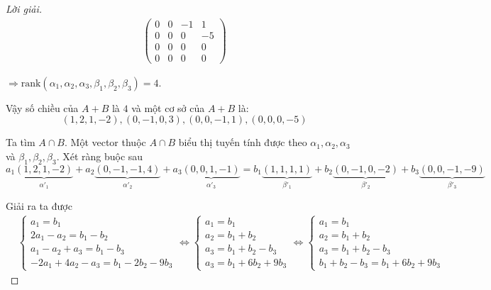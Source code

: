 \documentclass[class=linearalgebra,crop=false]{standalone}
\begin{document}
\begin{proof}[Lời giải]
\begin{align*}
\begin{pmatrix}
            0 & 0  & -1 & 1  \\
            0 & 0  & 0  & -5 \\
            0 & 0  & 0  & 0  \\
            0 & 0  & 0  & 0
        \end{pmatrix}
    \end{align*}
    \par $\Rightarrow\text{rank}(\alpha_{1},\alpha_{2},\alpha_{3},\beta_{1},\beta_{2},\beta_{3}) = 4$.
    \par Vậy số chiều của $A + B$ là $4$ và một cơ sở của $A + B$ là:
    \[ (1, 2, 1, -2), (0, -1, 0, 3), (0, 0, -1, 1), (0, 0, 0, -5) \]
    \par Ta tìm $A\cap B$. Một vector thuộc $A\cap B$ biểu thị tuyến tính được theo $\alpha_{1}, \alpha_{2}, \alpha_{3}$ và $\beta_{1}, \beta_{2}, \beta_{3}$. Xét ràng buộc sau
    \[ a_{1}\underbrace{(1,2,1,-2)}_{\alpha'_{1}} + a_{2}\underbrace{(0,-1,-1,4)}_{\alpha'_{2}} + a_{3}\underbrace{(0,0,1,-1)}_{\alpha'_{3}} = b_{1}\underbrace{(1,1,1,1)}_{\beta'_{1}} + b_{2}\underbrace{(0,-1,0,-2)}_{\beta'_{2}} + b_{3}\underbrace{(0,0,-1,-9)}_{\beta'_{3}} \]
    \par Giải ra ta được
    \begin{align*}
         & \begin{cases}
            a_{1} = b_{1}                         \\
            2a_{1} - a_{2} = b_{1} - b_{2}        \\
            a_{1} - a_{2} + a_{3} = b_{1} - b_{3} \\
            -2a_{1} + 4a_{2} - a_{3} = b_{1} - 2b_{2} - 9b_{3}
        \end{cases}
        \Longleftrightarrow
        \begin{cases}
            a_{1} = b_{1}                 \\
            a_{2} = b_{1} + b_{2}         \\
            a_{3} = b_{1} + b_{2} - b_{3} \\
            a_{3} = b_{1} + 6b_{2} + 9b_{3}
        \end{cases}
        \Longleftrightarrow
        \begin{cases}
            a_{1} = b_{1}                 \\
            a_{2} = b_{1} + b_{2}         \\
            a_{3} = b_{1} + b_{2} - b_{3} \\
            b_{1} + b_{2} - b_{3} = b_{1} + 6b_{2} + 9b_{3}

\end{cases}
\end{align*}
\end{proof}
\end{document}
